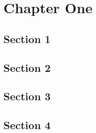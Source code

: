 \cleardoublepage %
\chapter{Chapter One}
\pagestyle{fancy}
\fancyhf{}
\fancyhead[RO]{\itshape \rightmark} %
\fancyhead[LE]{\itshape \leftmark}
\fancyfoot[RO]{\thepage}
\fancyfoot[LE]{\thepage}
\renewcommand{\headrulewidth}{0.5pt}
\renewcommand{\footrulewidth}{0pt}

\section{Section 1}
\blindmathpaper
\section{Section 2}
\blindmathpaper
\section{Section 3}
\blindmathpaper
\section{Section 4}
\blindmathpaper